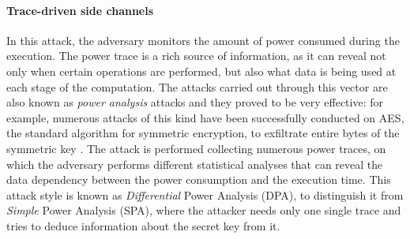\documentclass[target=mst,aauheader=aics]{thud}
\theoremstyle{definition}
\begin{document}
	\paragraph{Trace-driven side channels} In this attack, the adversary monitors the amount of power consumed during the execution. The power trace is a rich source of information, as it can reveal not only when certain operations are performed, but also what data is being used at each stage of the computation. The attacks carried out through this vector are also known as \textit{power analysis} attacks and they proved to be very effective: for example, numerous attacks of this kind have been successfully conducted on AES, the standard algorithm for symmetric encryption, to exfiltrate entire bytes of the symmetric key \cite{Buchanan2017, Mangard2003, Maisuradze2018, Oswald2004}. The attack is performed collecting numerous power traces, on which the adversary performs different statistical analyses that can reveal the data dependency between the power consumption and the execution time. This attack style is known as \textit{Differential} Power Analysis (DPA), to distinguish it from \textit{Simple} Power Analysis (SPA), where the attacker needs only one single trace and tries to deduce information about the secret key from it.
\end{document}
